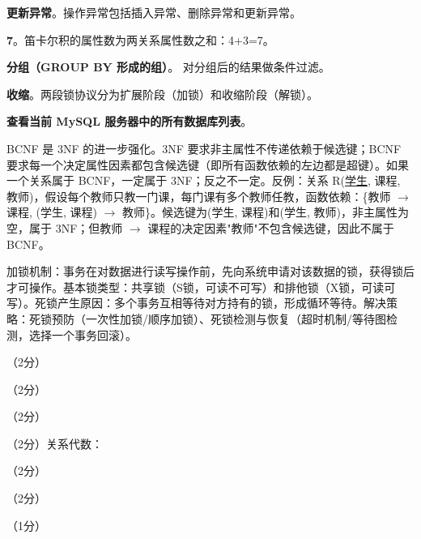 \documentclass[a4paper,11pt]{article}
\begin{document}


\q \textbf{更新异常}。操作异常包括插入异常、删除异常和更新异常。

\q \textbf{7}。笛卡尔积的属性数为两关系属性数之和：4+3=7。

\q \textbf{分组（GROUP BY 形成的组）}。 对分组后的结果做条件过滤。

\q \textbf{收缩}。两段锁协议分为扩展阶段（加锁）和收缩阶段（解锁）。

\q \textbf{查看当前 MySQL 服务器中的所有数据库列表}。


\q BCNF 是 3NF 的进一步强化。3NF 要求非主属性不传递依赖于候选键；BCNF 要求每一个决定属性因素都包含候选键（即所有函数依赖的左边都是超键）。如果一个关系属于 BCNF，一定属于 3NF；反之不一定。反例：关系 R(\underline{学生}, 课程, 教师)，假设每个教师只教一门课，每门课有多个教师任教，函数依赖：\{教师 $\rightarrow$ 课程, (学生, 课程) $\rightarrow$ 教师\}。候选键为(学生, 课程)和(学生, 教师)，非主属性为空，属于 3NF；但教师 $\rightarrow$ 课程的决定因素"教师"不包含候选键，因此不属于 BCNF。

\q 加锁机制：事务在对数据进行读写操作前，先向系统申请对该数据的锁，获得锁后才可操作。基本锁类型：共享锁（S锁，可读不可写）和排他锁（X锁，可读可写）。死锁产生原因：多个事务互相等待对方持有的锁，形成循环等待。解决策略：死锁预防（一次性加锁/顺序加锁）、死锁检测与恢复（超时机制/等待图检测，选择一个事务回滚）。


\q （2分）

\q （2分）

\q （2分）

\q （2分）关系代数：

\q （2分）

\q （2分）

\q （1分）
\end{document}
